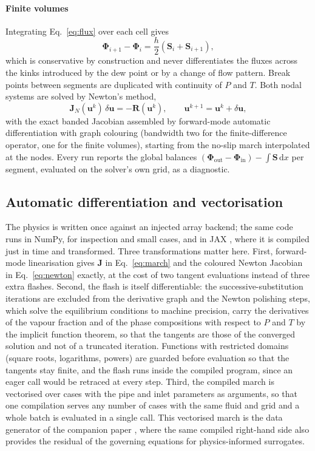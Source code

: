 \documentclass[a4paper,fleqn]{cas-sc}
\newcommand{\dd}{\mathrm{d}}
\newcommand{\bPhi}{\boldsymbol{\Phi}}
\newcommand{\bS}{\mathbf{S}}
\newcommand{\bu}{\mathbf{u}}
\newcommand{\bJ}{\mathbf{J}}
\begin{document}
\paragraph{Finite volumes} Integrating Eq.~\eqref{eq:flux} over each cell gives
\begin{equation}\label{eq:fv}
\bPhi_{i+1} - \bPhi_i = \frac{h}{2}\left(\bS_i + \bS_{i+1}\right),
\end{equation}
which is conservative by construction and never differentiates the fluxes across the kinks introduced by the dew point or by a change of flow pattern. Break points between segments are duplicated with continuity of $P$ and $T$. Both nodal systems are solved by Newton's method,
\begin{equation}\label{eq:newton}
\bJ_N(\bu^{k})\,\delta\bu = -\mathbf{R}(\bu^{k}), \qquad \bu^{k+1} = \bu^{k} + \delta\bu,
\end{equation}
with the exact banded Jacobian assembled by forward-mode automatic differentiation with graph colouring (bandwidth two for the finite-difference operator, one for the finite volumes), starting from the no-slip march interpolated at the nodes. Every run reports the global balances $(\bPhi_\mathrm{out} - \bPhi_\mathrm{in}) - \int \bS\,\dd x$ per segment, evaluated on the solver's own grid, as a diagnostic.

\subsection{Automatic differentiation and vectorisation}\label{sec:ad}

The physics is written once against an injected array backend; the same code runs in NumPy, for inspection and small cases, and in JAX \citep{jax2018}, where it is compiled just in time and transformed. Three transformations matter here. First, forward-mode linearisation gives $\bJ$ in Eq.~\eqref{eq:march} and the coloured Newton Jacobian in Eq.~\eqref{eq:newton} exactly, at the cost of two tangent evaluations instead of three extra flashes. Second, the flash is itself differentiable: the successive-substitution iterations are excluded from the derivative graph and the Newton polishing steps, which solve the equilibrium conditions to machine precision, carry the derivatives of the vapour fraction and of the phase compositions with respect to $P$ and $T$ by the implicit function theorem, so that the tangents are those of the converged solution and not of a truncated iteration. Functions with restricted domains (square roots, logarithms, powers) are guarded before evaluation so that the tangents stay finite, and the flash runs inside the compiled program, since an eager call would be retraced at every step. Third, the compiled march is vectorised over cases with the pipe and inlet parameters as arguments, so that one compilation serves any number of cases with the same fluid and grid and a whole batch is evaluated in a single call. This vectorised march is the data generator of the companion paper \citep{carvalho2026b}, where the same compiled right-hand side also provides the residual of the governing equations for physics-informed surrogates.
\end{document}
